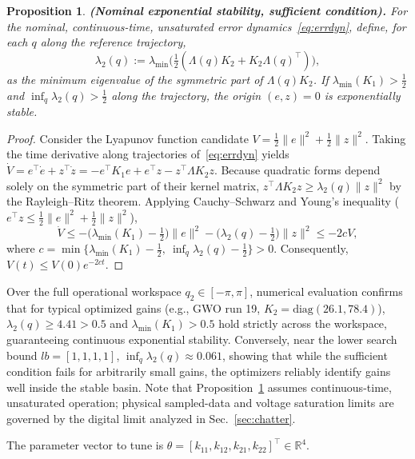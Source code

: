 \documentclass[a4paper,fleqn]{cas-dc}
\newtheorem{proposition}{Proposition}
\begin{document}
\begin{proposition}\label{prop:stability}
\textbf{(Nominal exponential stability, sufficient condition).}
For the nominal, continuous-time, unsaturated error dynamics~\eqref{eq:errdyn}, define, for each $q$ along the reference trajectory,
\begin{equation}
\lambda_2(q):=\lambda_{\min}\bigl(\tfrac12(\Lambda(q)K_2+K_2\Lambda(q)^\top)\bigr),
\end{equation}
as the minimum eigenvalue of the symmetric part of $\Lambda(q)K_2$. If $\lambda_{\min}(K_1)>\tfrac12$ and $\inf_q\lambda_2(q)>\tfrac12$ along the trajectory, the origin $(e,z)=0$ is exponentially stable.
\end{proposition}
\begin{proof}
Consider the Lyapunov function candidate $V=\tfrac12\|e\|^2+\tfrac12\|z\|^2$. Taking the time derivative along trajectories of~\eqref{eq:errdyn} yields $\dot V=e^\top\dot e+z^\top\dot z=-e^\top K_1e+e^\top z-z^\top\Lambda K_2z$. Because quadratic forms depend solely on the symmetric part of their kernel matrix, $z^\top\Lambda K_2z\ge\lambda_2(q)\|z\|^2$ by the Rayleigh--Ritz theorem. Applying Cauchy--Schwarz and Young's inequality ($e^\top z\le\tfrac12\|e\|^2+\tfrac12\|z\|^2$),
\[
\dot V\le-\bigl(\lambda_{\min}(K_1)-\tfrac12\bigr)\|e\|^2-\bigl(\lambda_2(q)-\tfrac12\bigr)\|z\|^2\le-2cV,
\]
where $c=\min\{\lambda_{\min}(K_1)-\tfrac12,\ \inf_q\lambda_2(q)-\tfrac12\}>0$. Consequently, $V(t)\le V(0)e^{-2ct}$.
\end{proof}
\begin{remark}
Over the full operational workspace $q_2\in[-\pi,\pi]$, numerical evaluation confirms that for typical optimized gains (e.g., GWO run 19, $K_2=\mathrm{diag}(26.1, 78.4)$), $\lambda_2(q)\ge 4.41 > 0.5$ and $\lambda_{\min}(K_1)>0.5$ hold strictly across the workspace, guaranteeing continuous exponential stability. Conversely, near the lower search bound $lb=[1,1,1,1]$, $\inf_q\lambda_2(q)\approx0.061$, showing that while the sufficient condition fails for arbitrarily small gains, the optimizers reliably identify gains well inside the stable basin. Note that Proposition~\ref{prop:stability} assumes continuous-time, unsaturated operation; physical sampled-data and voltage saturation limits are governed by the digital limit analyzed in Sec.~\ref{sec:chatter}.
\end{remark}

The parameter vector to tune is $\theta=[k_{11},k_{12},k_{21},k_{22}]^\top\in\mathbb{R}^4$.
\end{document}
